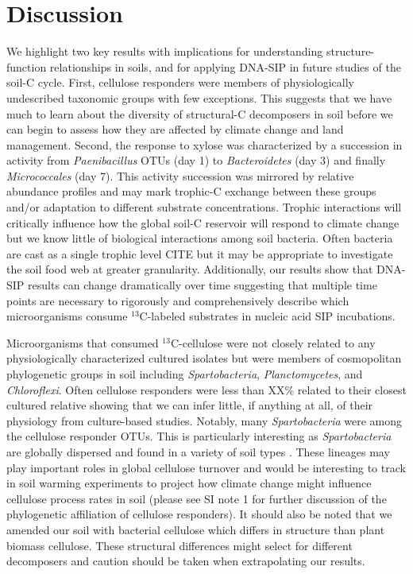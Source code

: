 \section{Discussion} 
We highlight two key results with implications for understanding structure-function
relationships in soils, and for applying DNA-SIP in future studies of the soil-C
cycle. First, cellulose responders were members of physiologically undescribed
taxonomic groups with few exceptions. This suggests that we have much to learn
about the diversity of structural-C decomposers in soil before we can begin to
assess how they are affected by climate change and land management. Second, the
response to xylose was characterized by a succession in activity from
\textit{Paenibacillus} OTUs (day 1) to \textit{Bacteroidetes} (day 3) and finally
\textit{Micrococcales} (day 7). This activity succession was mirrored by relative
abundance profiles and may mark trophic-C exchange between these groups and/or
adaptation to different substrate concentrations. Trophic interactions will
critically influence how the global soil-C reservoir will respond to climate
change \citep{Crowther2015} but we know little of biological interactions among
soil bacteria. Often bacteria are cast as a single trophic level CITE but it
may be appropriate to investigate the soil food web at greater granularity.
Additionally, our results show that DNA-SIP results can change dramatically
over time suggesting that multiple time points are necessary to rigorously and
comprehensively describe which microorganisms consume $^{13}$C-labeled
substrates in nucleic acid SIP incubations.

Microorganisms that consumed $^{13}$C-cellulose were not closely related to any
physiologically characterized cultured isolates but were members of
cosmopolitan phylogenetic groups in soil including \textit{Spartobacteria},
\textit{Planctomycetes}, and \textit{Chloroflexi}. Often cellulose responders
were less than XX\% related to their closest cultured relative showing that we
can infer little, if anything at all, of their physiology from culture-based
studies. Notably, many \textit{Spartobacteria} were among the cellulose responder OTUs.
This is particularly interesting as \textit{Spartobacteria} are globally
dispersed and found in a variety of soil types \citep{Bergmann_2011}. These lineages may play
important roles in global cellulose turnover and would be interesting to track
in soil warming experiments to project how climate change might influence
cellulose process rates in soil (please see SI note 1 for further discussion of the
phylogenetic affiliation of cellulose responders). It should also be noted that
we amended our soil with bacterial cellulose which differs in structure than
plant biomass cellulose. These structural differences might select for different 
decomposers and caution should be taken when extrapolating our results.

